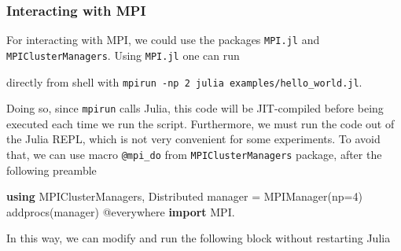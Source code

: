 \documentclass[11pt]{article}
\newenvironment{Shaded}{}{}
\newcommand{\KeywordTok}[1]{\textcolor[rgb]{0.00,0.44,0.13}{\textbf{{#1}}}}
\newcommand{\FloatTok}[1]{\textcolor[rgb]{0.25,0.63,0.44}{{#1}}}
\newcommand{\StringTok}[1]{\textcolor[rgb]{0.25,0.44,0.63}{{#1}}}
\newcommand{\NormalTok}[1]{{#1}}
\newcommand{\ConstantTok}[1]{\textcolor[rgb]{0.53,0.00,0.00}{{#1}}}
\newcommand{\OperatorTok}[1]{\textcolor[rgb]{0.40,0.40,0.40}{{#1}}}
\newcommand{\PreprocessorTok}[1]{\textcolor[rgb]{0.74,0.48,0.00}{{#1}}}
\begin{document}
\hypertarget{interacting-with-mpi}{%
\subsubsection{Interacting with MPI}\label{interacting-with-mpi}}

For interacting with MPI, we could use the packages \texttt{MPI.jl} and 
\texttt{MPIClusterManagers}. Using \texttt{MPI.jl} one can run

\begin{Shaded}
\end{Shaded}

directly from shell with \texttt{mpirun\ -np\ 2\ julia\ examples/hello\_world.jl}.

Doing so, since \texttt{mpirun} calls Julia, this code will be 
JIT-compiled before being executed each time we run the script. Furthermore,
we must run the code out of the Julia REPL, which is not very convenient
for some experiments. To avoid that, we can use macro \texttt{@mpi\_do} 
from \texttt{MPIClusterManagers} package, after the following preamble

\begin{Shaded}
\begin{Highlighting}[]
\KeywordTok{using}\NormalTok{ MPIClusterManagers}\OperatorTok{,}\NormalTok{ Distributed}
\NormalTok{manager }\OperatorTok{=}\NormalTok{ MPIManager(np}\OperatorTok{=}\FloatTok{4}\NormalTok{)}
\NormalTok{addprocs(manager)}
\PreprocessorTok{@everywhere} \KeywordTok{import}\NormalTok{ MPI.}
\end{Highlighting}
\end{Shaded}

In this way, we can modify and run the following block without restarting Julia

\begin{Shaded}
\end{Shaded}
\end{document}
